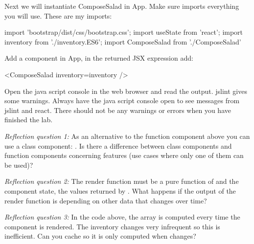\documentclass[fleqn, article, a4paper]{memoir}
\begin{document}
\begin{Assignments}
\noindent Next we will instantiate ComposeSalad in App. Make sure  imports everything you will use. These are my imports:
\begin{Code}
import 'bootstrap/dist/css/bootstrap.css';
import { useState } from 'react';
import inventory from './inventory.ES6';
import ComposeSalad from './ComposeSalad'
\end{Code}

\noindent Add a  component in App, in the returned JSX expression add:
\begin{Code}
<ComposeSalad inventory={inventory} />
\end{Code}

\noindent Open the java script console in the web browser and read the output. jslint gives some warnings. Always have the java script console open to see messages from jslint and react. There should not be any warnings or errors when you have finished the lab.

\emph{Reflection question 1:} As an alternative to the function component above you can use a class component: . Is there a difference between class components and function components concerning features (use cases where only one of them can be used)?

\emph{Reflection question 2:} The render function must be a pure function of  and the component state, the values returned by . What happens if the output of the render function is depending on other data that changes over time?

\emph{Reflection question 3:} In the code above, the  array is computed every time the component is rendered. The inventory changes very infrequent so this is inefficient. Can you cache  so it is only computed when  changes?


\end{Assignments}
\end{document}
